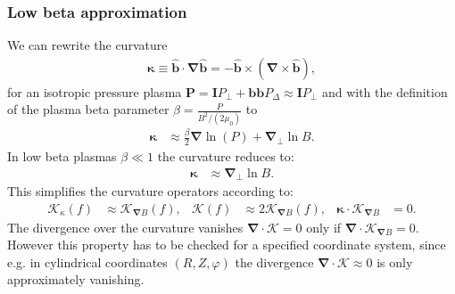 \documentclass{hitec} %
\renewcommand{\vec}[1]{\boldsymbol{#1}}
\begin{document}
\subsubsection{Low beta approximation}\label{sec:lowbetaapprox}
We can rewrite the curvature
\begin{align}
 \vec{\kappa} \equiv \vec{\hat{b}} \cdot \vec{\nabla} \vec{\hat{b}} = - \vec{\hat{b}} \times \left(\vec{\nabla} \times \vec{\hat{b}} \right) ,
\end{align}
for an isotropic pressure plasma \(\vec{P} = \vec{I} P_\perp + \vec{b} \vec{b} P_\Delta \approx \vec{I} P_\perp\) and with the definition of the plasma beta parameter 
\(\beta = \frac{P}{B^2/(2 \mu_0) } \) to
\begin{align}
 \vec{\kappa} &\approx \frac{\beta}{2} \vec{\nabla} \ln(P) +\vec{\nabla}_\perp \ln{B} .
\end{align}
In low beta plasmas \(\beta\ll1\) the curvature reduces to:
\begin{align}\label{eq:kappalowbeta}
 \vec{\kappa} & \approx \vec{\nabla}_\perp \ln{B} .
\end{align}
This simplifies the curvature operators according to:
\begin{align}
\mathcal{K}_{\kappa}(f)   &\approx  \mathcal{K}_{\vec{\nabla}  B}(f),  & 
\mathcal{K} (f) &\approx2 \mathcal{K}_{\vec{\nabla}  B} (f) , &
 \vec{\kappa} \cdot \vec{\mathcal{K}}_{\vec{\nabla}  B} &= 0.
\end{align}
The divergence over the curvature vanishes \( \vec{\nabla} \cdot \vec{ \mathcal{K} } = 0\) only if \( \vec{\nabla} \cdot \vec{ \mathcal{K}}_{\vec{\nabla}  B}   = 0\). 
However this property has to be checked for a specified coordinate system, since e.g. in cylindrical coordinates \((R,Z,\varphi)\) the divergence \( \vec{\nabla} \cdot \vec{ \mathcal{K} } \approx 0\) is only approximately vanishing.
\end{document}
